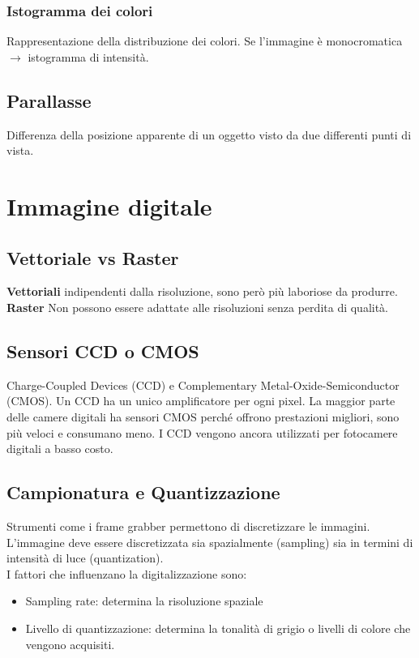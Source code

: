 \documentclass[8pt,a4paper]{article}
\begin{document}
\begin{multicols}{5}
    \subsubsection{Istogramma dei colori}
    Rappresentazione della distribuzione dei colori. Se l'immagine è monocromatica
    $\rightarrow $ istogramma di intensità.

    \subsection{Parallasse}
    Differenza della posizione apparente di un oggetto visto da due differenti punti di 
    vista.

    \section{Immagine digitale}
    \subsection{Vettoriale vs Raster}
    \textbf{Vettoriali} indipendenti dalla risoluzione, sono però più laboriose da 
    produrre. \\
    \textbf{Raster} Non possono essere adattate alle risoluzioni senza perdita di qualità.
    \subsection{Sensori CCD o CMOS}
    Charge-Coupled Devices (CCD) e Complementary Metal-Oxide-Semiconductor (CMOS).
    Un CCD ha un unico amplificatore per ogni pixel.
    La maggior parte delle camere digitali ha sensori CMOS
    perché offrono prestazioni migliori, sono più veloci e consumano meno. 
    I CCD vengono ancora utilizzati per fotocamere digitali a basso costo.

    \subsection{Campionatura e Quantizzazione}
    Strumenti come i frame grabber permettono di discretizzare le immagini.
    L'immagine deve essere discretizzata sia spazialmente (sampling)
    sia in termini di intensità di luce (quantization). \\
    I fattori che influenzano la digitalizzazione sono:
    \begin{itemize}
      \item Sampling rate: determina la risoluzione spaziale
      \item Livello di quantizzazione: determina la tonalità di grigio o livelli
        di colore che vengono acquisiti. 
    \end{itemize}


\end{multicols}
\end{document}
